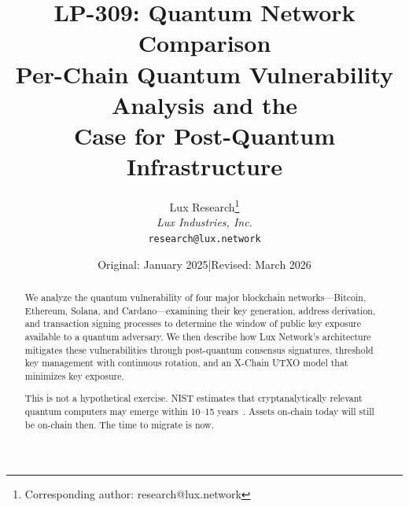 \documentclass[11pt,a4paper]{article}
\title{LP-309: Quantum Network Comparison\\[4pt]
\large Per-Chain Quantum Vulnerability Analysis and the\\
Case for Post-Quantum Infrastructure}
\author{
Lux Research\thanks{Corresponding author: research@lux.network}\\
\textit{Lux Industries, Inc.}\\
\texttt{research@lux.network}
}
\date{Original: January 2025\quad|\quad Revised: March 2026}
\begin{document}
\luxcoverpage

\begin{abstract}
We analyze the quantum vulnerability of four major blockchain
networks---Bitcoin, Ethereum, Solana, and Cardano---examining their
key generation, address derivation, and transaction signing processes
to determine the window of public key exposure available to a quantum
adversary. We then describe how Lux Network's architecture mitigates
these vulnerabilities through post-quantum consensus signatures,
threshold key management with continuous rotation, and an X-Chain UTXO
model that minimizes key exposure.

This is not a hypothetical exercise. NIST estimates that
cryptanalytically relevant quantum computers may emerge within 10--15
years~\cite{nist-pqc-report}. Assets on-chain today will still be
on-chain then. The time to migrate is now.
\end{abstract}

\tableofcontents
\newpage








\end{document}
